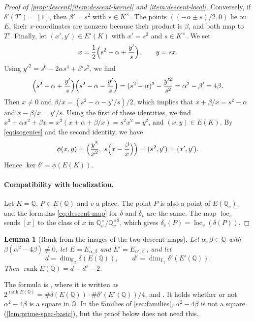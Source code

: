 \documentclass[12pt,oneside,openany]{book}
\theoremstyle{definition}
\theoremstyle{plain}
\numberwithin{equation}{chapter}
\theoremstyle{plain}
\newtheorem{lemma}[lemma]{Lemma}
\theoremstyle{definition}
\theoremstyle{remark}
\newcommand{\Q}{\mathbb Q}
\newcommand{\F}{\mathbb F}
\DeclareMathOperator{\rk}{rank}
\newcommand{\sq}[1]{[#1]}
\newcommand{\sqgp}[1]{#1^{\times}/#1^{\times2}}
\begin{document}
\begin{proof}[Proof of \cref{prop:descent}\ref{item:descent-kernel} and \ref{item:descent-local}]
Conversely, if $\delta'(T')=\sq1$, then $\beta'=s^2$ with $s\in K^\times$. The points $((-\alpha\pm s)/2,0)$ lie on $E$, their $x$-coordinates are nonzero because their product is $\beta$, and both map to $T'$. Finally, let $(x',y')\in E'(K)$ with $x'=s^2$ and $s\in K^\times$. We set
\begin{equation}\label{eq:preimage-phi}
x=\frac12\Bigl(s^2-\alpha+\frac{y'}s\Bigr),\qquad y=sx.
\end{equation}
Using $y'^2=s^6-2\alpha s^4+\beta's^2$, we find
\begin{equation}\label{eq:preimage-phi-product}
\Bigl(s^2-\alpha+\frac{y'}s\Bigr)\Bigl(s^2-\alpha-\frac{y'}s\Bigr)=(s^2-\alpha)^2-\frac{y'^2}{s^2}=\alpha^2-\beta'=4\beta.
\end{equation}
Then $x\ne0$ and $\beta/x=(s^2-\alpha-y'/s)/2$, which implies that $x+\beta/x=s^2-\alpha$ and $x-\beta/x=y'/s$. Using the first of these identities, we find $x^3+\alpha x^2+\beta x=x^2(x+\alpha+\beta/x)=s^2x^2=y^2$, and $(x,y)\in E(K)$. By \eqref{eq:isogenies} and the second identity, we have
\begin{equation}
\phi(x,y)=\Bigl(\frac{y^2}{x^2},\ s\Bigl(x-\frac\beta x\Bigr)\Bigr)=(s^2,y')=(x',y').
\end{equation}
Hence $\ker\delta'=\phi(E(K))$.

\paragraph{Compatibility with localization.} Let $K=\Q$, $P\in E(\Q)$ and $v$ a place. The point $P$ is also a point of $E(\Q_v)$, and the formulas \eqref{eq:descent-map} for $\delta$ and $\delta_v$ are the same. The map $\operatorname{loc}_v$ sends $\sq x$ to the class of $x$ in $\sqgp{\Q_v}$, which gives $\delta_v(P)=\operatorname{loc}_v(\delta(P))$.
\end{proof}

\begin{lemma}[Rank from the images of the two descent maps]\label{lem:rank-formula}
Let $\alpha,\beta\in\Q$ with $\beta(\alpha^2-4\beta)\ne0$, let $E=E_{\alpha,\beta}$ and $E'=E_{\alpha',\beta'}$, and let
\begin{equation}\label{eq:d-dprime}
d=\dim_{\F_2}\delta(E(\Q)),\qquad d'=\dim_{\F_2}\delta'(E'(\Q)).
\end{equation}
Then $\rk E(\Q)=d+d'-2$.
\end{lemma}

The formula is \cite[Section~3.6]{SilvermanTate2015}, where it is written as $2^{\rk E(\Q)}=\#\delta(E(\Q))\cdot\#\delta'(E'(\Q))/4$, and \cite[Lemma~3.1]{Zywina2026}. It holds whether or not $\alpha^2-4\beta$ is a square in $\Q$. In the families of \cref{sec:families}, $\alpha^2-4\beta$ is not a square (\cref{lem:prime-spec-basic}), but the proof below does not need this.
\end{document}
